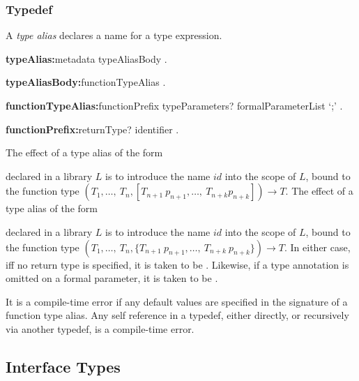 \documentclass{article}
\begin{document}
\subsubsection{Typedef}

\LMHash{}
A {\em type alias} declares a name for a type expression.

\begin{grammar}
{\bf typeAlias:}metadata \TYPEDEF{} typeAliasBody
  .

{\bf typeAliasBody:}functionTypeAlias
  .

{\bf functionTypeAlias:}functionPrefix typeParameters? formalParameterList `{\escapegrammar ;}'
  .

{\bf functionPrefix:}returnType? identifier
  .
\end{grammar}


\LMHash{}
The effect of a type alias of the form


\noindent
declared in a library $L$ is to introduce the name $id$ into the scope of $L$, bound to the function type
$(T_1, \ldots,\ T_n, [T_{n+1}\ p_{n+1}, \ldots,\ T_{n+k} p_{n+k}]) \rightarrow T$.
The effect of a type alias of the form


\noindent
declared in a library $L$ is to introduce the name $id$ into the scope of $L$, bound to the function type
$(T_1, \ldots,\ T_n, \{T_{n+1}\ p_{n+1}, \ldots,\ T_{n+k}\ p_{n+k}\}) \rightarrow T$.
In either case, if{}f no return type is specified, it is taken to be \DYNAMIC{}.
Likewise, if a type annotation is omitted on a formal parameter, it is taken to be \DYNAMIC{}.

\LMHash{}
It is a compile-time error if any default values are specified in the signature of a function type alias.
Any self reference in a typedef, either directly, or recursively via another typedef, is a compile-time error.


\subsection{Interface Types}
\end{document}
